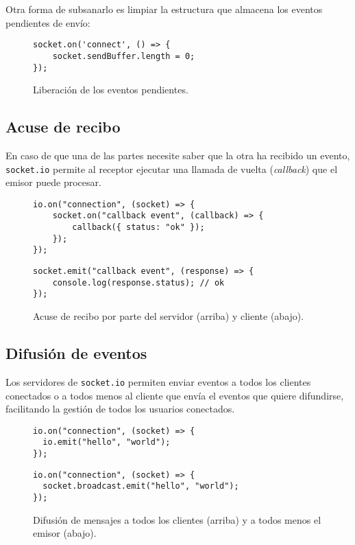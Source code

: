 \documentclass[runningheads]{llncs}
\begin{document}
Otra forma de subsanarlo es limpiar la estructura que almacena los eventos pendientes de envío:

\begin{figure}[!ht]
\begin{lstlisting}
socket.on('connect', () => {
	socket.sendBuffer.length = 0;
});
\end{lstlisting}
\caption{Liberación de los eventos pendientes.}
\end{figure}

\subsection{Acuse de recibo}

En caso de que una de las partes necesite saber que la otra ha recibido un evento, \texttt{socket.io} permite al receptor ejecutar una llamada de vuelta (\textit{callback}) que el emisor puede procesar\cite{acknowledgements}.

\begin{figure}[!ht]
\begin{lstlisting}
io.on("connection", (socket) => {
	socket.on("callback event", (callback) => {
		callback({ status: "ok" });
	});
});
\end{lstlisting}
\begin{lstlisting}
socket.emit("callback event", (response) => {
	console.log(response.status); // ok
});
\end{lstlisting}
\caption{Acuse de recibo por parte del servidor (arriba) y cliente (abajo).}
\end{figure}

\subsection{Difusión de eventos}

Los servidores de \texttt{socket.io} permiten enviar eventos a todos los clientes conectados o a todos menos al cliente que envía el eventos que quiere difundirse, facilitando la gestión de todos los usuarios conectados\cite{broadcast}.

\begin{figure}[!ht]
\begin{lstlisting}
io.on("connection", (socket) => {
  io.emit("hello", "world");
});
\end{lstlisting}
\begin{lstlisting}
io.on("connection", (socket) => {
  socket.broadcast.emit("hello", "world");
});
\end{lstlisting}
\caption{Difusión de mensajes a todos los clientes (arriba) y a todos menos el emisor (abajo).}
\end{figure}
\end{document}
